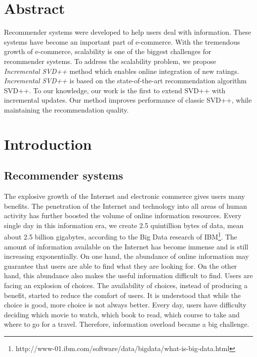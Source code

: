 \documentclass[oneside,13pt]{extreport}
\begin{document}
\renewcommand\contentsname{Table of contents}
\tableofcontents
\clearpage

\listoffigures
 \clearpage
 
\listoftables
 

\chapter*{Abstract}
Recommender systems were developed to help users deal with information. These systems have become an important part of e-commerce. With the tremendous growth of e-commerce, scalability is one of the biggest challenges for recommender systems. 
To address the scalability problem, we propose \textit{Incremental SVD++} method which enables online integration of new ratings. \textit{Incremental SVD++} is based on the state-of-the-art recommendation algorithm SVD++. To our knowledge, our work is the first to extend SVD++ with incremental updates. Our method improves performance of classic SVD++, while maintaining the recommendation quality.

\chapter{Introduction}
\renewcommand{\thepage}{\arabic{page}}
\setcounter{page}{1}
\section{Recommender systems}
The explosive growth  of the Internet and electronic commerce gives users many benefits. The penetration of the Internet and technology into all areas of human activity has further boosted the volume of online information resources. Every single day in this information era, we create 2.5 quintillion bytes of data, mean about 2.5 billion gigabytes, according to the Big Data research of IBM\footnote{http://www-01.ibm.com/software/data/bigdata/what-is-big-data.html}. The amount of information available on the Internet has become immense and is still increasing exponentially. On one hand, the abundance of online information may guarantee that users are able to find what they are looking for. On the other hand, this abundance also makes the useful information difficult to find. Users are facing an explosion of choices. The availability of choices, instead of producing a benefit, started to reduce the comfort of users. It is understood that while the choice is good, more choice is not always better. Every day, users have difficulty deciding which movie to watch, which book to read, which course to take and where to go for a travel. Therefore, information overload became a big challenge. 
\end{document}
